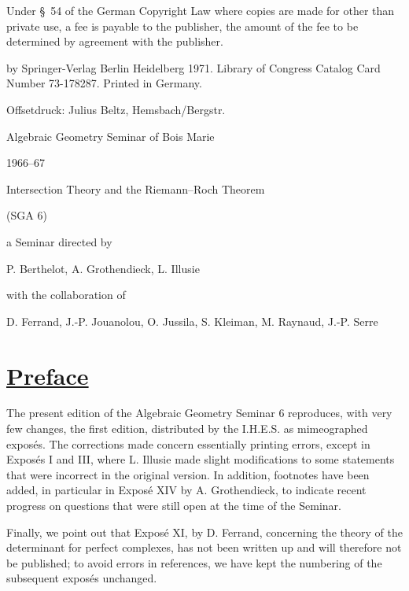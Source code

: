 Under \S~54 of the German Copyright Law where copies are made for other than
private use, a fee is payable to the publisher, the amount of the fee to be
determined by agreement with the publisher.

\textcopyright{} by Springer-Verlag Berlin \textperiodcentered{} Heidelberg 1971.
Library of Congress Catalog Card Number 73-178287. Printed in Germany.

Offsetdruck: Julius Beltz, Hemsbach/Bergstr.


%
\begin{center}
{\Large Algebraic Geometry Seminar of Bois Marie}\par
{\large 1966--67}\par
\vspace{1.5em}
{\Large Intersection Theory and the Riemann--Roch Theorem}\par
{\large (SGA 6)}\par
\vspace{1.5em}
a Seminar directed by\par
P. Berthelot, A. Grothendieck, L. Illusie\par
with the collaboration of\par
D. Ferrand, J.-P. Jouanolou, O. Jussila, S. Kleiman, M. Raynaud, J.-P. Serre
\end{center}

%
%
\section*{\underline{Preface}}
The present edition of the Algebraic Geometry Seminar 6 reproduces, with very few changes, the first edition, distributed by the I.H.E.S. as mimeographed exposés. The corrections made concern essentially printing errors, except in Exposés I and III, where L. Illusie made slight modifications to some statements that were incorrect in the original version. In addition, footnotes have been added, in particular in Exposé XIV by A. Grothendieck, to indicate recent progress on questions that were still open at the time of the Seminar.

Finally, we point out that Exposé XI, by D. Ferrand, concerning the theory of the determinant for perfect complexes, has not been written up and will therefore not be published; to avoid errors in references, we have kept the numbering of the subsequent exposés unchanged.

